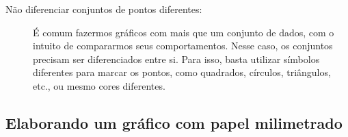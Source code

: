 \begin{description}
    \item[Não diferenciar conjuntos de pontos diferentes:] É comum fazermos gráficos com mais que um conjunto de dados, com o intuito de compararmos seus comportamentos. Nesse caso, os conjuntos precisam ser diferenciados entre si. Para isso, basta utilizar símbolos diferentes para marcar os pontos, como quadrados, círculos, triângulos, etc., ou mesmo cores diferentes.
\end{description}

\subsection{Elaborando um gráfico com papel milimetrado}

